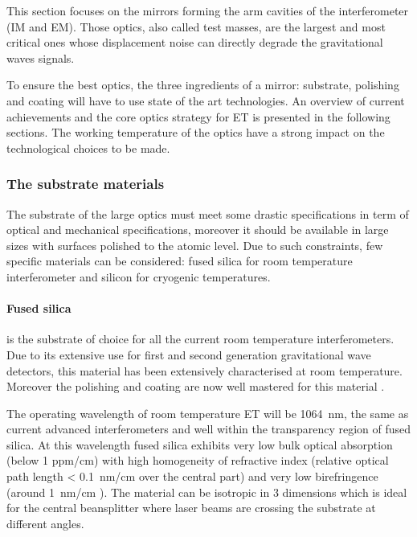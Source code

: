This section focuses on the mirrors forming the arm cavities of the interferometer (IM and EM). Those optics, also called test masses, are the largest  and most critical ones whose displacement noise can directly degrade the   gravitational waves signals.

To ensure the best optics, the three ingredients of a mirror: substrate, polishing and coating will have to use state of the art technologies. An overview of current achievements and the core optics strategy for ET is presented in the following sections. The working temperature of the optics  have a strong impact on the technological choices to be made. 

\subsubsection{The substrate materials}

The substrate of the large  optics must meet some drastic  specifications in term of optical and mechanical specifications, moreover it should be available in large sizes with surfaces polished to the atomic level. Due to such constraints, few specific materials can be considered: fused silica for room temperature interferometer and silicon for cryogenic temperatures.\\

\paragraph{Fused silica} is the substrate of choice for all the current room temperature interferometers.  Due to its  extensive
use for first and second generation gravitational wave detectors, this material has been extensively characterised at room temperature. Moreover the polishing and coating are now well mastered for this material \cite{pinard2017mirrors}.

The operating wavelength of room temperature ET will be 1064~nm, the same as current advanced interferometers and well within the transparency region of fused silica. At this wavelength fused silica exhibits very low bulk optical absorption (below 1 ppm/cm) with high homogeneity of refractive index (relative optical path length < 0.1~nm/cm over the central part) and very low birefringence (around 1~nm/cm \cite{Degallaix:Large_optics_19}). The material can be isotropic in 3 dimensions which is ideal for the central beansplitter where laser beams are crossing the substrate at different angles.

